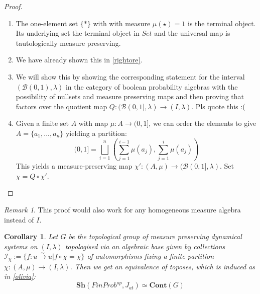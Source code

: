 \documentclass[a4paper,draft]{amsproc}
\theoremstyle{plain}
\newtheorem{corollary}{Corollary}[section]
\theoremstyle{definition}
\theoremstyle{remark}
\newtheorem{remark}{Remark}[section]
\numberwithin{equation}{section}
\begin{document}
\begin{proof} 
\begin{enumerate}
\item The one-element set $\{*\}$ with with measure $\mu(\star)=1$ is the terminal object. Its underlying set the terminal object in $Set$ and the universal map is tautologically measure preserving.
\item We have already shown this in \ref{rightore}.
\item We will show this by showing the corresponding statement for the interval $(\mathcal{B}(0,1),\lambda)$ in the category of boolean probability algebras with the possibility of nullsets and measure preserving maps and then proving that factors over the quotient map $Q: (\mathcal{B}(0,1],\lambda)\rightarrow (I,\lambda)$. Pls quote this :(
\item Given a finite set $A$ with map $\mu:A\rightarrow (0,1]$, we can order the elements to give $A=\{a_1,...,a_n\}$ yielding a partition:
\[ (0,1]=\bigsqcup_{i=1}^n (\sum_{j=1}^{i-1} \mu(a_j), \sum_{j=1}^{i} \mu(a_j))\]
This yields a measure-preserving map $\chi':(A,\mu)\rightarrow (\mathcal{B}(0,1],\lambda)$. Set $\chi=Q\circ \chi'$.


\end{enumerate}
\end{proof}
\begin{remark} This proof would also work for any homogeneous measure algebra instead of $I$.
\end{remark}
\begin{corollary} Let $G$ be the topological group of measure preserving dynamical systems on $(I,\lambda)$ topologised via an algebraic base given by collections $\mathcal{I}_{\chi}:=\{f:u\overset{\sim}{\rightarrow} u| f\circ \chi=\chi\} $ of automorphisms fixing a finite partition $\chi: (A,\mu)\rightarrow (I,\lambda)$. Then we get an equivalence of toposes, which is induced as in \ref{olivia}:
\[\textbf{Sh}(FinProb^{op}, J_{at})\simeq \textbf{Cont}(G)\]
\end{corollary}
\end{document}
